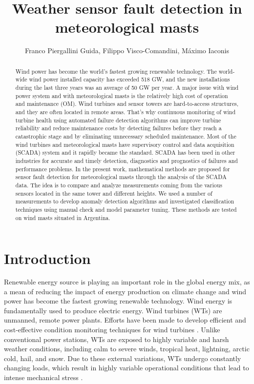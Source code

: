 \documentclass[journal]{IEEEtran}
\begin{document}
\title{Weather sensor fault detection in meteorological masts}

\author{Franco Piergallini Guida, Filippo Visco-Comandini, Máximo Iaconis}
\maketitle

\begin{abstract}
Wind power has become the world's fastest growing renewable technology. The world-wide wind power installed capacity has exceeded 518 GW, and the new installations during the last three years was an average of 50 GW per year. A major issue with wind power system and with meteorological masts is the relatively high cost of operation and maintenance (OM). Wind turbines and sensor towers are hard-to-access structures, and they are often located in remote areas. That's why continuous monitoring of wind turbine health using automated failure detection algorithms can improve turbine reliability and reduce maintenance costs by detecting failures before they reach a catastrophic stage and by eliminating unnecessary scheduled maintenance.
Most of the wind turbines and meteorological masts have supervisory control and data acquisition (SCADA) system and it rapidly became the standard. SCADA has been used in other industries for accurate and timely detection, diagnostics and prognostics of failures and performance problems.
In the present work, mathematical methods are proposed for sensor fault detection for meteorological masts through the analysis of the SCADA data. The idea is to compare and analyze measurements coming from the various sensors located in the same tower and different heights. We used a number of measurements to develop anomaly detection algorithms and investigated classification techniques using manual check and model parameter tuning. 
These methods are tested on wind masts situated in Argentina.
\end{abstract}
\section{Introduction}
Renewable energy source is playing an important role in the global energy mix, as a mean of reducing the impact of energy production on climate change and wind power has become the fastest growing renewable technology. 
Wind energy is fundamentally used to produce electric energy. Wind turbines (WTs) are unmanned, remote power plants.  Efforts have been made to develop efficient and cost-effective condition monitoring techniques for wind turbines \cite{yang2014wind}. Unlike conventional power stations, WTs are exposed to highly variable and harsh weather conditions, including calm to severe winds, tropical heat, lightning, arctic cold, hail, and snow. Due to these external variations, WTs undergo constantly changing loads, which result in highly variable operational conditions that lead to intense mechanical stress \cite{ribrant2006thesis}. 
\end{document}
